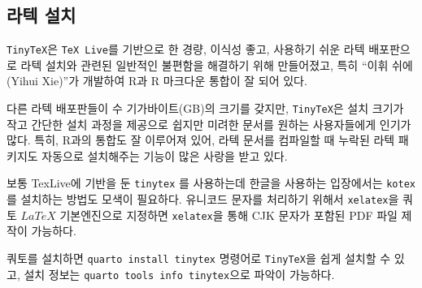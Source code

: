 \documentclass[
  letterpaper,
]{book}
\newenvironment{Shaded}{\begin{snugshade}}{\end{snugshade}}
\newcommand{\ErrorTok}[1]{\textcolor[rgb]{0.68,0.00,0.00}{#1}}
\newcommand{\ExtensionTok}[1]{\textcolor[rgb]{0.00,0.23,0.31}{#1}}
\newcommand{\KeywordTok}[1]{\textcolor[rgb]{0.00,0.23,0.31}{#1}}
\newcommand{\NormalTok}[1]{\textcolor[rgb]{0.00,0.23,0.31}{#1}}
\newcommand{\StringTok}[1]{\textcolor[rgb]{0.13,0.47,0.30}{#1}}
\begin{document}
\hypertarget{uxb77cuxd14d-uxc124uxce58}{%
\subsection{라텍 설치}\label{uxb77cuxd14d-uxc124uxce58}}

\texttt{TinyTeX}은 \texttt{TeX\ Live}를 기반으로 한 경량, 이식성 좋고,
사용하기 쉬운 라텍 배포판으로 라텍 설치와 관련된 일반적인 불편함을
해결하기 위해 만들어졌고, 특히 ``이휘 쉬에(Yihui Xie)''가 개발하여 R과 R
마크다운 통합이 잘 되어 있다.

다른 라텍 배포판들이 수 기가바이트(GB)의 크기를 갖지만,
\texttt{TinyTeX}은 설치 크기가 작고 간단한 설치 과정을 제공으로 쉽지만
미려한 문서를 원하는 사용자들에게 인기가 많다. 특히, R과의 통합도 잘
이루어져 있어, 라텍 문서를 컴파일할 때 누락된 라텍 패키지도 자동으로
설치해주는 기능이 많은 사랑을 받고 있다.

보통 TexLive에 기반을 둔 \texttt{tinytex} 를 사용하는데 한글을 사용하는
입장에서는 \texttt{kotex}를 설치하는 방법도 모색이 필요하다. 유니코드
문자를 처리하기 위해서 \texttt{xelatex}을 쿼토 \(LaTeX\) 기본엔진으로
지정하면 \texttt{xelatex}을 통해 CJK 문자가 포함된 PDF 파일 제작이
가능하다.

쿼토를 설치하면 \texttt{quarto\ install\ tinytex} 명령어로
\texttt{TinyTeX}을 쉽게 설치할 수 있고, 설치 정보는
\texttt{quarto\ tools\ info\ tinytex}으로 파악이 가능하다.

\begin{Shaded}
\end{Shaded}
\end{document}
